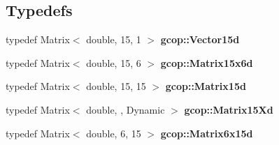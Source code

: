 \subsection*{\-Typedefs}
\begin{DoxyCompactItemize}
\item 
typedef \-Matrix$<$ double, 15, 1 $>$ {\bf gcop\-::\-Vector15d}
\item 
typedef \-Matrix$<$ double, 15, 6 $>$ {\bf gcop\-::\-Matrix15x6d}
\item 
typedef \-Matrix$<$ double, 15, 15 $>$ {\bf gcop\-::\-Matrix15d}
\item 
typedef \-Matrix$<$ double, , \-Dynamic $>$ {\bf gcop\-::\-Matrix15\-Xd}
\item 
typedef \-Matrix$<$ double, 6, 15 $>$ {\bf gcop\-::\-Matrix6x15d}
\end{DoxyCompactItemize}
